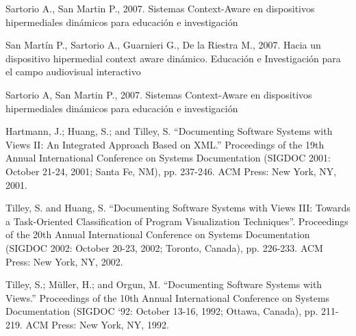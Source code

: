 \documentclass{llncs}
\begin{document}
\begin{thebibliography}{1}

 Sartorio A., San Martin P., 2007. {Sistemas Context-Aware en dispositivos hipermediales dinámicos para educación e investigación}

 San Martín P., Sartorio A., Guarnieri G., De la Riestra M., 2007. {Hacia un dispositivo hipermedial context aware dinámico. Educación e Investigación para el campo audiovisual interactivo}

 Sartorio A, San Martin P., 2007. {Sistemas Context-Aware en dispositivos hipermediales dinámicos para educación e investigación}

 Hartmann, J.; Huang, S.; and Tilley, S. {“Documenting
Software Systems with Views II: An Integrated Approach
Based on XML.”} Proceedings of the 19th Annual
International Conference on Systems Documentation
(SIGDOC 2001: October 21-24, 2001; Santa Fe, NM), pp.
237-246. ACM Press: New York, NY, 2001.

 Tilley, S. and Huang, S. {“Documenting Software Systems
with Views III: Towards a Task-Oriented Classification of
Program Visualization Techniques”.} Proceedings of the 20th
Annual International Conference on Systems Documentation
(SIGDOC 2002: October 20-23, 2002; Toronto, Canada), pp.
226-233. ACM Press: New York, NY, 2002.

 Tilley, S.; Müller, H.; and Orgun, M. “Documenting
Software Systems with Views.” Proceedings of the 10th
Annual International Conference on Systems Documentation
(SIGDOC ‘92: October 13-16, 1992; Ottawa, Canada), pp.
211-219. ACM Press: New York, NY, 1992.

\end{thebibliography}
\end{document}
